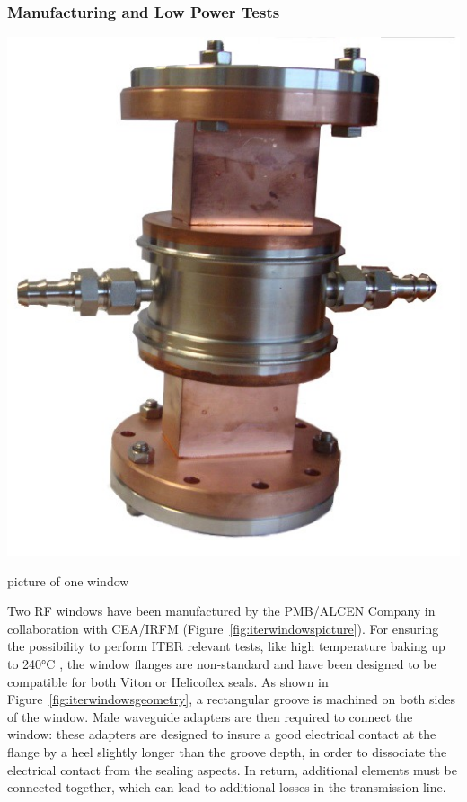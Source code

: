 {\subsubsection{Manufacturing and Low Power Tests}\label{sec:ITER_windows_manuf_low_power_tests}
\begin{marginfigure}
	\centering
	\includegraphics[width=1.0\linewidth]{figures/chap3/ITER_window/ITER_windows_picture}
	\caption{picture of one window}
	\label{fig:iterwindowspicture}
\end{marginfigure}
Two RF windows have been manufactured by the PMB/ALCEN Company in collaboration with CEA/IRFM (Figure~\ref{fig:iterwindowspicture}). For ensuring the possibility to perform ITER relevant tests, like high temperature baking up to 240$\si{\degreeCelsius}$ , the window flanges are non-standard and have been designed to be compatible for both Viton or Helicoflex seals. As shown in Figure~\ref{fig:iterwindowsgeometry}, a rectangular groove is machined on both sides of the window. Male waveguide adapters are then required to connect the window: these adapters are designed to insure a good electrical contact at the flange by a heel slightly longer than the groove depth, in order to dissociate the electrical contact from the sealing aspects. In return, additional elements must be connected together, which can lead to additional losses in the transmission line.   

}
